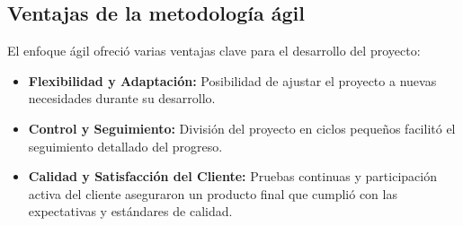 \subsection{Ventajas de la metodología ágil}
\label{subsec:ventajas_agil}

El enfoque ágil ofreció varias ventajas clave para el desarrollo del proyecto:
\begin{itemize}
    \item \textbf{Flexibilidad y Adaptación:} Posibilidad de ajustar el proyecto a nuevas necesidades durante su desarrollo.
    \item \textbf{Control y Seguimiento:} División del proyecto en ciclos pequeños facilitó el seguimiento detallado del progreso.
    \item \textbf{Calidad y Satisfacción del Cliente:} Pruebas continuas y participación activa del cliente aseguraron un producto final que cumplió con las expectativas y estándares de calidad.
\end{itemize}
